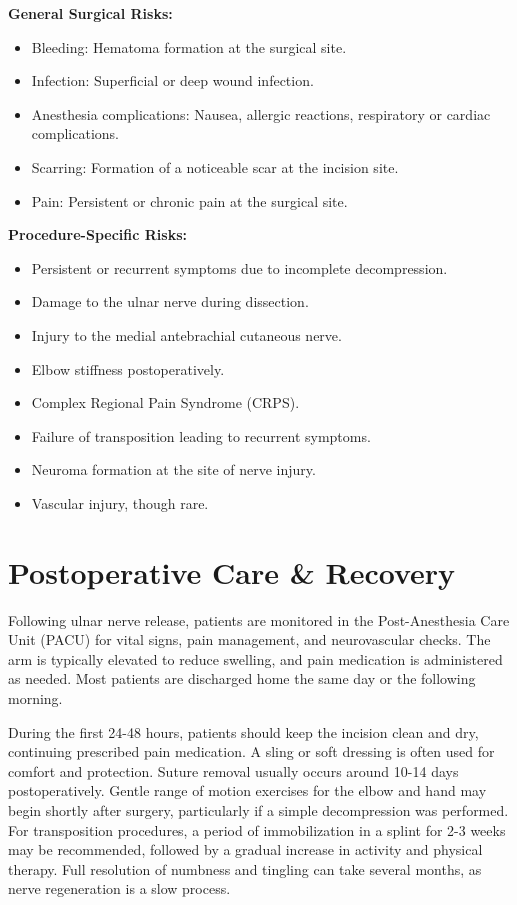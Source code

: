 \textbf{General Surgical Risks:}
\begin{itemize}
  \item Bleeding: Hematoma formation at the surgical site.
  \item Infection: Superficial or deep wound infection.
  \item Anesthesia complications: Nausea, allergic reactions, respiratory or cardiac complications.
  \item Scarring: Formation of a noticeable scar at the incision site.
  \item Pain: Persistent or chronic pain at the surgical site.
\end{itemize}

\textbf{Procedure-Specific Risks:}
\begin{itemize}
  \item Persistent or recurrent symptoms due to incomplete decompression.
  \item Damage to the ulnar nerve during dissection.
  \item Injury to the medial antebrachial cutaneous nerve.
  \item Elbow stiffness postoperatively.
  \item Complex Regional Pain Syndrome (CRPS).
  \item Failure of transposition leading to recurrent symptoms.
  \item Neuroma formation at the site of nerve injury.
  \item Vascular injury, though rare.
\end{itemize}

\section*{Postoperative Care \& Recovery}
Following ulnar nerve release, patients are monitored in the Post-Anesthesia Care Unit (PACU) for vital signs, pain management, and neurovascular checks. The arm is typically elevated to reduce swelling, and pain medication is administered as needed. Most patients are discharged home the same day or the following morning.

During the first 24-48 hours, patients should keep the incision clean and dry, continuing prescribed pain medication. A sling or soft dressing is often used for comfort and protection. Suture removal usually occurs around 10-14 days postoperatively. Gentle range of motion exercises for the elbow and hand may begin shortly after surgery, particularly if a simple decompression was performed. For transposition procedures, a period of immobilization in a splint for 2-3 weeks may be recommended, followed by a gradual increase in activity and physical therapy. Full resolution of numbness and tingling can take several months, as nerve regeneration is a slow process.

